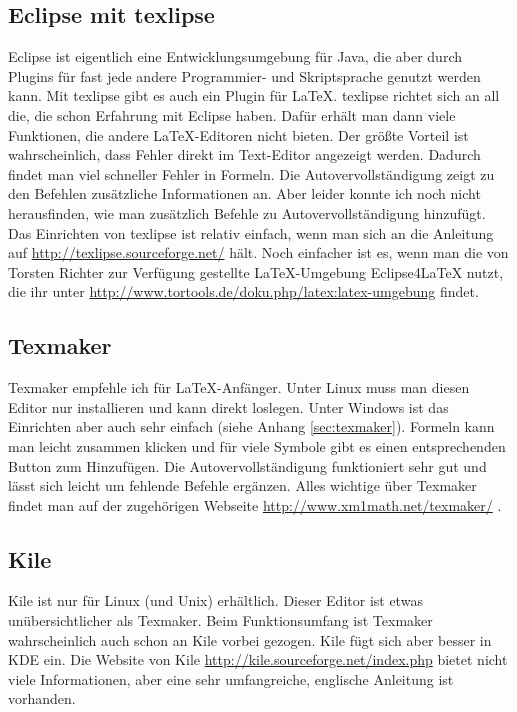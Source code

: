\subsection{Eclipse mit texlipse}

Eclipse ist eigentlich eine Entwicklungsumgebung für Java, die aber durch Plugins für fast jede andere Programmier- und Skriptsprache genutzt werden kann. Mit texlipse gibt es auch ein Plugin für \LaTeX. texlipse richtet sich an all die, die schon Erfahrung mit Eclipse haben. Dafür erhält man dann viele Funktionen, die andere \LaTeX-Editoren nicht bieten. Der größte Vorteil ist wahrscheinlich, dass Fehler direkt im Text-Editor angezeigt werden. Dadurch findet man viel schneller Fehler in Formeln. Die Autovervollständigung zeigt zu den Befehlen zusätzliche Informationen an. Aber leider konnte ich noch nicht herausfinden, wie man zusätzlich Befehle zu Autovervollständigung hinzufügt.\\
Das Einrichten von texlipse ist relativ einfach, wenn man sich an die Anleitung auf \url{http://texlipse.sourceforge.net/} hält.
Noch einfacher ist es, wenn man die von Torsten Richter zur Verfügung gestellte \LaTeX-Umgebung Eclipse4LaTeX nutzt, die ihr unter \url{http://www.tortools.de/doku.php/latex:latex-umgebung} findet.

\subsection{Texmaker}

Texmaker empfehle ich für \LaTeX-Anfänger. Unter Linux muss man diesen Editor nur installieren und kann direkt loslegen. Unter Windows ist das Einrichten aber auch sehr einfach (siehe Anhang \ref{sec:texmaker}). Formeln kann man leicht zusammen klicken und für viele Symbole gibt es einen entsprechenden Button zum Hinzufügen. Die Autovervollständigung funktioniert sehr gut und lässt sich leicht um fehlende Befehle ergänzen. Alles wichtige über Texmaker findet man auf der zugehörigen Webseite \url{http://www.xm1math.net/texmaker/} .

\subsection{Kile}

Kile ist nur für Linux (und Unix) erhältlich. Dieser Editor ist etwas unübersichtlicher als Texmaker. Beim Funktionsumfang ist Texmaker wahrscheinlich auch schon an Kile vorbei gezogen. Kile fügt sich aber besser in KDE ein. Die Website von Kile \url{http://kile.sourceforge.net/index.php} bietet nicht viele Informationen, aber eine sehr umfangreiche, englische Anleitung ist vorhanden.

